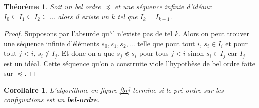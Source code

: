 \documentclass[a4paper, twoside]{scrartcl}
\theoremstyle{plain}%
\newtheorem{thm}{Théorème}[section]
\newtheorem*{cor}{Corollaire}
\theoremstyle{definition}
\theoremstyle{remark}
\begin{document}


\begin{thm} \label{th_i}
  Soit un bel ordre $\preceq$ et une séquence infinie d'idéaux $I_0
  \subseteq I_1 \subseteq I_2 \subseteq ...$ alors il existe un $k$
  tel que $I_k = I_{k+1}$.
\end{thm}

\begin{proof}
  Supposons par l'absurde qu'il n'existe pas de tel $k$. Alors on peut
  trouver une séquence infinie d'éléments $s_0, s_1, s_2, ...$ telle
  que pout tout $i$, $s_i \in I_i$ et pour tout $j < i$, $s_i \not \in
  I_j$. Et donc on a que $s_j \not \preceq s_i$ pour tous $j < i$
  sinon $s_i \in I_j$ car $I_j$ est un idéal. Cette séquence qu'on a
  construite viole l'hypothèse de bel ordre faite sur $\preceq$.
\end{proof}



\begin{cor}
  L'algorithme en figure \ref{br} termine si le pré-ordre sur les
  configuations est un \textbf{bel-ordre}.
\end{cor}
\end{document}
